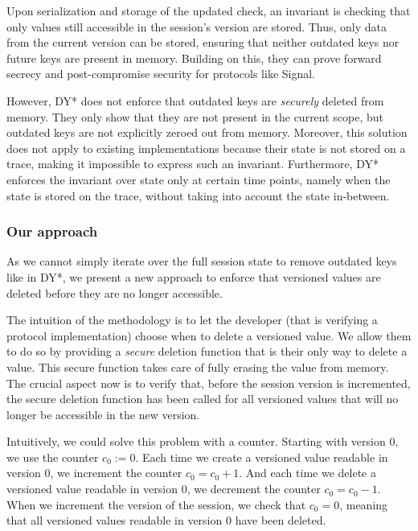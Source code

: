 Upon serialization and storage of the updated check, an invariant is checking that only values still accessible in the session's version are stored.
Thus, only data from the current version can be stored, ensuring that neither outdated keys nor future keys are present in memory.
Building on this, they can prove forward secrecy and post-compromise security for protocols like Signal.

However, DY* does not enforce that outdated keys are \emph{securely} deleted from memory. They only show that they are not present in the current scope, but outdated keys are not explicitly zeroed out from memory.
Moreover, this solution does not apply to existing implementations because their state is not stored on a trace, making it impossible to express such an invariant.
Furthermore, DY* enforces the invariant over state only at certain time points, namely when the state is stored on the trace, without taking into account the state in-between.

\subsubsection{Our approach}

As we cannot simply iterate over the full session state to remove outdated keys like in DY*, we present a new approach to enforce that versioned values are deleted before they are no longer accessible.

The intuition of the methodology is to let the developer (that is verifying a protocol implementation) choose when to delete a versioned value.
We allow them to do so by providing a \emph{secure} deletion function that is their only way to delete a value. This secure function takes care of fully erasing the value from memory.
The crucial aspect now is to verify that, before the session version is incremented, the secure deletion function has been called for all versioned values that will no longer be accessible in the new version.

Intuitively, we could solve this problem with a counter. Starting with version $0$, we use the counter $c_0 := 0$.
Each time we create a versioned value readable in version $0$, we increment the counter $c_0 = c_0 + 1$.
And each time we delete a versioned value readable in version $0$, we decrement the counter $c_0 = c_0 - 1$.
When we increment the version of the session, we check that $c_0 = 0$, meaning that all versioned values readable in version $0$ have been deleted.

